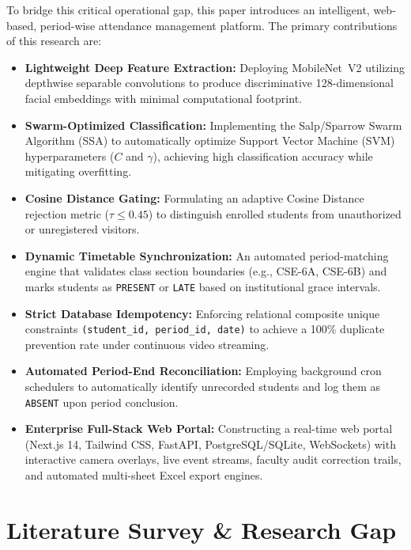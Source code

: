 \documentclass[conference]{IEEEtran}
\begin{document}
To bridge this critical operational gap, this paper introduces an intelligent, web-based, period-wise attendance management platform. The primary contributions of this research are:
\begin{itemize}
    \item \textbf{Lightweight Deep Feature Extraction:} Deploying MobileNet~V2 utilizing depthwise separable convolutions to produce discriminative 128-dimensional facial embeddings with minimal computational footprint.
    \item \textbf{Swarm-Optimized Classification:} Implementing the Salp/Sparrow Swarm Algorithm (SSA) to automatically optimize Support Vector Machine (SVM) hyperparameters ($C$ and $\gamma$), achieving high classification accuracy while mitigating overfitting.
    \item \textbf{Cosine Distance Gating:} Formulating an adaptive Cosine Distance rejection metric ($\tau \le 0.45$) to distinguish enrolled students from unauthorized or unregistered visitors.
    \item \textbf{Dynamic Timetable Synchronization:} An automated period-matching engine that validates class section boundaries (e.g., CSE-6A, CSE-6B) and marks students as \texttt{PRESENT} or \texttt{LATE} based on institutional grace intervals.
    \item \textbf{Strict Database Idempotency:} Enforcing relational composite unique constraints \texttt{(student\_id, period\_id, date)} to achieve a 100\% duplicate prevention rate under continuous video streaming.
    \item \textbf{Automated Period-End Reconciliation:} Employing background cron schedulers to automatically identify unrecorded students and log them as \texttt{ABSENT} upon period conclusion.
    \item \textbf{Enterprise Full-Stack Web Portal:} Constructing a real-time web portal (Next.js 14, Tailwind CSS, FastAPI, PostgreSQL/SQLite, WebSockets) with interactive camera overlays, live event streams, faculty audit correction trails, and automated multi-sheet Excel export engines.
\end{itemize}

\section{Literature Survey \& Research Gap}
\end{document}
